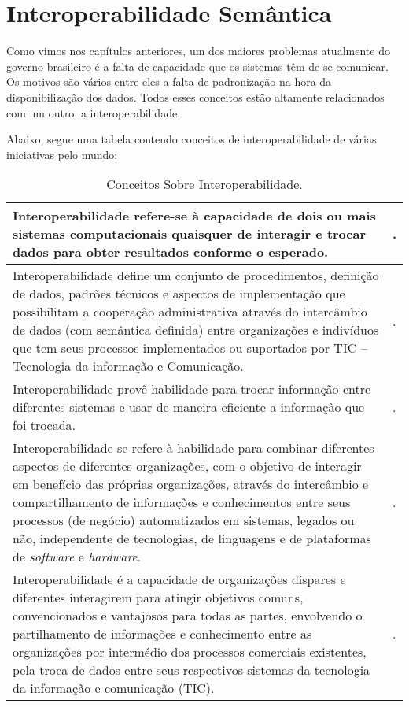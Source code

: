 \chapter{Interoperabilidade Semântica}

Como vimos nos capítulos anteriores, um dos maiores problemas atualmente do governo brasileiro é a falta de capacidade que os sistemas têm de se comunicar. Os motivos são vários entre eles a falta de padronização na hora da disponibilização dos dados. Todos esses conceitos estão altamente relacionados com um outro, a interoperabilidade.
	
Abaixo, segue uma tabela contendo conceitos de interoperabilidade de várias iniciativas pelo mundo:

\begin{table}[H]
\begin{center}
    \begin{tabular}{ | p{}  | p{3cm} | }
    \hline
   Interoperabilidade refere-se à capacidade de dois ou mais sistemas computacionais quaisquer de interagir e trocar dados para obter resultados conforme o esperado.& \cite{kamada}. \\ \hline
   Interoperabilidade define um conjunto de procedimentos, definição de dados, padrões técnicos e aspectos de implementação que possibilitam a cooperação administrativa através do intercâmbio de dados (com semântica definida) entre organizações e indivíduos que tem seus processos implementados ou suportados por TIC – Tecnologia da informação e Comunicação. & \cite{spb}. \\ \hline
  Interoperabilidade provê habilidade para trocar informação entre diferentes sistemas e usar de maneira eficiente a informação que foi trocada. & \cite{qualipso}. \\ \hline
   Interoperabilidade se refere à habilidade para combinar diferentes aspectos de diferentes organizações, com o objetivo de interagir em benefício das próprias organizações, através do intercâmbio e compartilhamento de informações e conhecimentos entre seus processos (de negócio) automatizados em sistemas, legados ou não, independente de tecnologias, de linguagens e de plataformas de \emph{software} e \emph{hardware}. & \cite{spb}. \\ \hline
Interoperabilidade é a capacidade de organizações díspares e diferentes interagirem para atingir objetivos comuns, convencionados e vantajosos para todas as partes, envolvendo o partilhamento de informações e conhecimento entre as organizações por intermédio dos processos comerciais existentes, pela troca de dados entre seus respectivos sistemas da tecnologia da informação e comunicação (TIC). & \cite{eif}.\\ \hline
   \end{tabular}
    \caption{Conceitos Sobre Interoperabilidade.}
    \label{tab-interoperabilidade}
\end{center}
\end{table}

